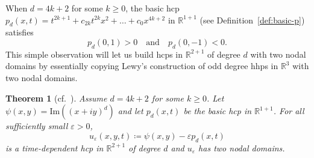 \documentclass[10pt]{amsart}
\newtheorem{theo}{Theorem}[section]
\theoremstyle{definition}\newtheorem{defi}[theo]{Definition}\newtheorem{rema}[theo]{Remark}\newtheorem{exam}[theo]{Example}\newtheorem{exem}[theo]{Example}\newtheorem{nota}[theo]{Notation}
\newcommand{\R}{\mathbb{R}}
\renewcommand{\Im}{\mathrm{Im}}
\renewcommand{\epsilon}{\varepsilon}
\begin{document}
When $d=4k+2$ for some $k\geq 0$, the basic hcp $p_d(x,t)=t^{2k+1}+c_{2k}t^{2k}x^2+\dots+c_0 x^{4k+2}$ in $\R^{1+1}$ (see Definition~\ref{def:basic-p}) satisfies
\begin{equation*}\label{pd-odd}
p_d(0,1)>0\quad\text{and}\quad p_d(0,-1)<0.
\end{equation*}
This simple observation will let us build hcps in $\R^{2+1}$ of degree $d$ with two nodal domains by essentially copying Lewy's construction of odd degree hhps in $\R^3$ with two nodal domains.

\begin{theo}[{cf.~\cite[Theorem~1]{Lewy77}}]\label{thm:2mod4}
Assume $d=4k+2$ for some $k\geq 0$. Let $\psi(x,y)=\Im((x+iy)^d)$ and let $p_d(x,t)$ be the basic hcp in $\R^{1+1}$. For all sufficiently small $\epsilon>0$,
\begin{equation}
u_\epsilon(x,y,t) \coloneqq \psi(x,y) - \epsilon p_d(x,t) \label{eqn:lewy_u}
\end{equation}
is a time-dependent hcp in $\R^{2+1}$ of degree $d$ and $u_\epsilon$ has two nodal domains.
\end{theo}
\end{document}
